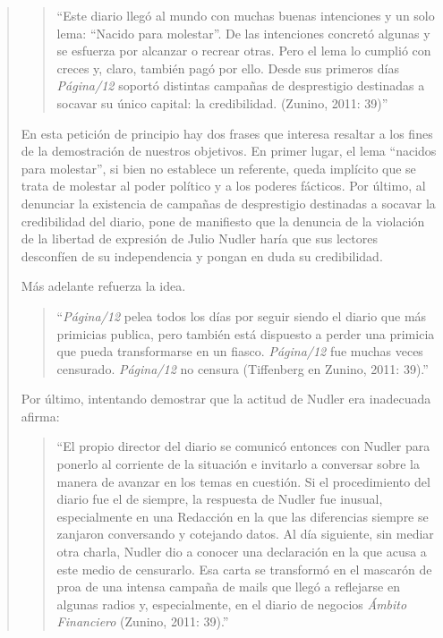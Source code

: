 \begin{quote}
\begin{quote}
	\enquote{Este diario llegó al mundo con muchas buenas intenciones y un solo lema: ``Nacido para molestar''. De las intenciones concretó algunas y se esfuerza por alcanzar o recrear otras. Pero el lema lo cumplió con creces y, claro, también pagó por ello. Desde sus primeros días \emph{Página/12} soportó distintas campañas de desprestigio destinadas a socavar su único capital: la credibilidad. (Zunino, 2011: 39)}
\end{quote}


En esta petición de principio hay dos frases que interesa resaltar a los fines de la demostración de nuestros objetivos. En primer lugar, el lema ``nacidos para molestar'', si bien no establece un referente, queda implícito que se trata de molestar al poder político y a los poderes fácticos. Por último, al denunciar la existencia de campañas de desprestigio destinadas a socavar la credibilidad del diario, pone de manifiesto que la denuncia de la violación de la libertad de expresión de Julio Nudler haría que sus lectores desconfíen de su independencia y pongan en duda su credibilidad.

Más adelante refuerza la idea.

\begin{quote}
	\enquote{\emph{Página/12} pelea todos los días por seguir siendo el diario que más primicias publica, pero también está dispuesto a perder una primicia que pueda transformarse en un fiasco. \emph{Página/12} fue muchas veces censurado. \emph{Página/12} no censura (Tiffenberg en Zunino, 2011: 39).}
\end{quote}


Por último, intentando demostrar que la actitud de Nudler era inadecuada afirma:

\begin{quote}
	\enquote{El propio director del diario se comunicó entonces con Nudler para ponerlo al corriente de la situación e invitarlo a conversar sobre la manera de avanzar en los temas en cuestión. Si el procedimiento del diario fue el de siempre, la respuesta de Nudler fue inusual, especialmente en una Redacción en la que las diferencias siempre se zanjaron conversando y cotejando datos. Al día siguiente, sin mediar otra charla, Nudler dio a conocer una declaración en la que acusa a este medio de censurarlo. Esa carta se transformó en el mascarón de proa de una intensa campaña de mails que llegó a reflejarse en algunas radios y, especialmente, en el diario de negocios \emph{Ámbito Financiero }(Zunino, 2011: 39).}
\end{quote}



\end{quote}
